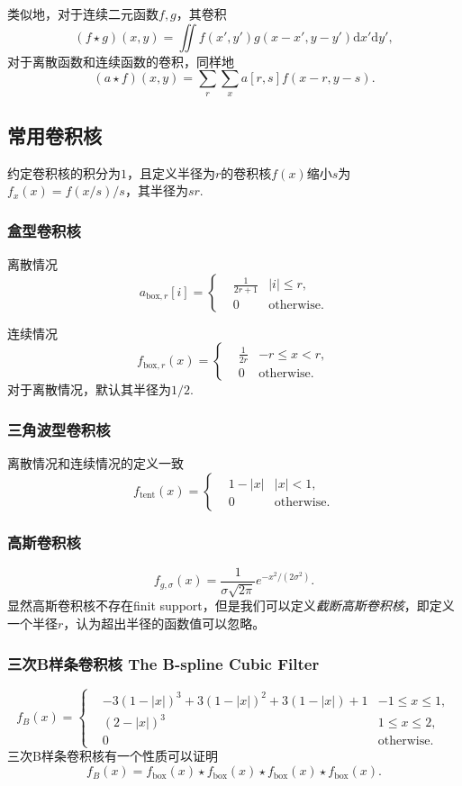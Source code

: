 \documentclass{ctexart}
\begin{document}
	类似地，对于连续二元函数$f,g$，其卷积
	$$
	(f\star g)(x,y)=\iint f(x',y')g(x-x',y-y')\mathrm dx'\mathrm dy',
	$$
	对于离散函数和连续函数的卷积，同样地
	$$
	(a\star f)(x,y)=\sum_r\sum_xa[r,s]f(x-r,y-s).
	$$

	\subsection{常用卷积核}
	约定卷积核的积分为$1$，且定义半径为$r$的卷积核$f(x)$缩小$s$为$f_x(x)=f(x/s)/s$，其半径为$sr$.

	\subsubsection{盒型卷积核}
	离散情况
	$$
	a_{\text{box},r}[i]=\left\{
		\begin{aligned}
			&\frac1{2r+1}&|i|\leqslant r,\\
			&0&\text{otherwise}.
		\end{aligned}
	\right.
	$$

	连续情况
	$$
	f_{\text{box},r}(x)=\left\{
		\begin{aligned}
			&\frac1{2r}&-r\leqslant x<r,\\
			&0&\text{otherwise}.
		\end{aligned}
	\right.
	$$
	对于离散情况，默认其半径为$1/2$.

	\subsubsection{三角波型卷积核}
	离散情况和连续情况的定义一致
	$$
	f_{\text{tent}}(x)=\left\{
		\begin{aligned}
			&1-|x|&|x|<1,\\
			&0&\text{otherwise}.
		\end{aligned}
	\right.
	$$

	\subsubsection{高斯卷积核}
	$$
	f_{g,\sigma}(x)=\frac1{\sigma\sqrt{2\pi}}e^{-x^2/(2\sigma^2)}.
	$$
	显然高斯卷积核不存在finit support，但是我们可以定义\emph{截断高斯卷积核}，即定义一个半径$r$，认为超出半径的函数值可以忽略。

	\subsubsection{三次B样条卷积核 The B-spline Cubic Filter}
	$$
	f_B(x)=\left\{
		\begin{aligned}
			&-3(1-|x|)^3+3(1-|x|)^2+3(1-|x|)+1&-1\leqslant x\leqslant 1,\\
			&(2-|x|)^3&1\leqslant x\leqslant 2,\\
			&0&\text{otherwise}.
		\end{aligned}
	\right.
	$$
	三次B样条卷积核有一个性质可以证明
	$$
	f_B(x)=f_{\text{box}}(x)\star f_{\text{box}}(x)\star f_{\text{box}}(x)\star f_{\text{box}}(x).
	$$
\end{document}
